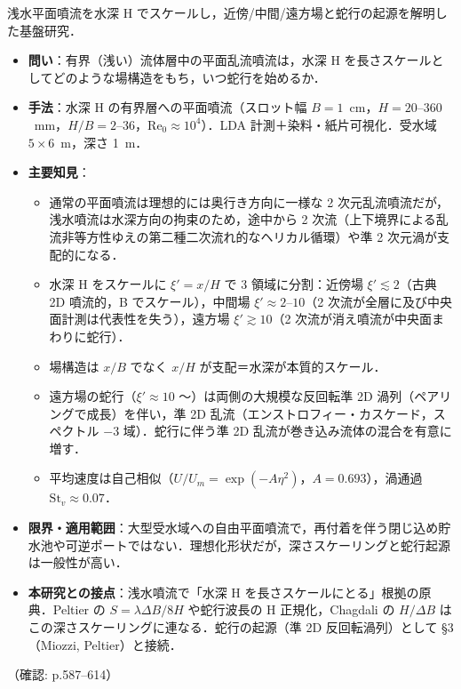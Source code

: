 \documentclass[11pt]{jsarticle}
\newcommand{\litref}[1]{{\large\bfseries\color{citecolor}#1}}
\begin{document}
\noindent\litref{Dracos et al. (1992)}\quad 浅水平面噴流を水深 H でスケールし，近傍/中間/遠方場と蛇行の起源を解明した基盤研究．
\begin{itemize}
  \item \textbf{問い}：有界（浅い）流体層中の平面乱流噴流は，水深 H を長さスケールとしてどのような場構造をもち，いつ蛇行を始めるか．
  \item \textbf{手法}：水深 H の有界層への平面噴流（スロット幅 $B=1$~cm，$H=20$--$360$~mm，$H/B=2$--$36$，$\mathrm{Re}_0 \approx 10^4$）．LDA 計測＋染料・紙片可視化．受水域 $5 \times 6$~m，深さ 1~m．
  \item \textbf{主要知見}：
  \begin{itemize}
    \item 通常の平面噴流は理想的には奥行き方向に一様な 2 次元乱流噴流だが，浅水噴流は水深方向の拘束のため，途中から 2 次流（上下境界による乱流非等方性ゆえの第二種二次流れ的なヘリカル循環）や準 2 次元渦が支配的になる．
    \item 水深 H をスケールに $\xi'=x/H$ で 3 領域に分割：近傍場 $\xi' \lesssim 2$（古典 2D 噴流的，B でスケール），中間場 $\xi' \approx 2$--$10$（2 次流が全層に及び中央面計測は代表性を失う），遠方場 $\xi' \gtrsim 10$（2 次流が消え噴流が中央面まわりに蛇行）．
    \item 場構造は $x/B$ でなく $x/H$ が支配＝水深が本質的スケール．
    \item 遠方場の蛇行（$\xi' \approx 10$ 〜）は両側の大規模な反回転準 2D 渦列（ペアリングで成長）を伴い，準 2D 乱流（エンストロフィー・カスケード，スペクトル $-3$ 域）．蛇行に伴う準 2D 乱流が巻き込み流体の混合を有意に増す．
    \item 平均速度は自己相似（$U/U_m=\exp(-A\eta^2)$，$A=0.693$），渦通過 $\mathrm{St}_v \approx 0.07$．
  \end{itemize}
  \item \textbf{限界・適用範囲}：大型受水域への自由平面噴流で，再付着を伴う閉じ込め貯水池や可逆ポートではない．理想化形状だが，深さスケーリングと蛇行起源は一般性が高い．
  \item \textbf{本研究との接点}：浅水噴流で「水深 H を長さスケールにとる」根拠の原典．Peltier の $S=\lambda\Delta B/8H$ や蛇行波長の H 正規化，Chagdali の $H/\Delta B$ はこの深さスケーリングに連なる．蛇行の起源（準 2D 反回転渦列）として §3（Miozzi, Peltier）と接続．
\end{itemize}
\noindent（確認: p.587--614）
\end{document}
